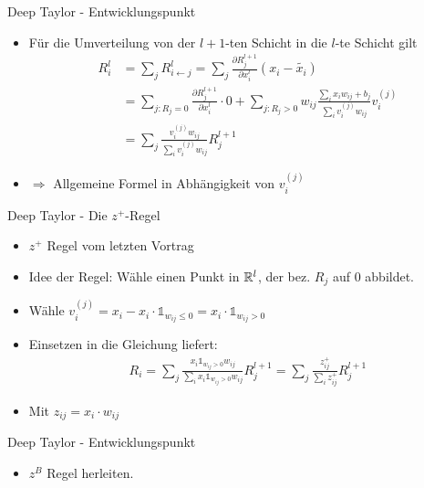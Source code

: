 \begin{frame}{Deep Taylor - Entwicklungspunkt}
\begin{itemize}
\item Für die Umverteilung von der $l+1$-ten Schicht in die $l$-te Schicht gilt
\begin{align*}
R_i^l &= \sum_{j} R_{i \leftarrow j}^l =  \sum_{j} \frac{\partial R_{j}^{l+1}}{\partial x_{i}^l}
(x_i - \tilde{x_i}) \\
&= \sum_{j : R_j = 0} \frac{\partial R_{j}^{l+1}}{\partial x_{i}^l} \cdot 0 + \sum_{j: R_j>0} w_{ij} \frac{\sum_{i} x_{i} w_{i j}+b_{j}}{\sum_{i} v_{i}^{(j)} w_{i j}} v_i^{(j)} \\
&= \sum_{j} \frac{v_i^{(j)}  w_{i j}}{\sum_{i} v_{i}^{(j)} w_{i j}} R_j^{l+1}
\end{align*}
\item $\Rightarrow$ Allgemeine Formel in Abhängigkeit von $v_i^{(j)}$
\end{itemize}
\end{frame}

\begin{frame}{Deep Taylor - Die $z^+$-Regel}
\begin{itemize}
\item $z^+$ Regel vom letzten Vortrag
\item Idee der Regel: Wähle einen Punkt in $\mathbb{R}^l$, der bez. $R_j$ auf $0$ abbildet.
\item Wähle $v_i^{(j)} = x_i - x_i \cdot \mathds{1}_{w_{ij} \leq 0} = x_i \cdot \mathds{1}_{w_{ij} > 0}$
\item Einsetzen in die Gleichung liefert:
\begin{align*}
R_i = \sum_{j} \frac{x_i \mathds{1}_{w_{ij} > 0} w_{i j}}{\sum_{i} x_i \mathds{1}_{w_{ij} > 0} w_{i j}} R_j^{l+1} = \sum_{j} \frac{z_{ij}^{+}}{\sum_{i} z_{ij}^{+}} R_j^{l+1}
\end{align*}
\item Mit $z_{ij} = x_i \cdot w_{ij}$
\end{itemize}
\end{frame}

\begin{frame}{Deep Taylor - Entwicklungspunkt}
\begin{itemize}
\item $z^B$ Regel herleiten.
\end{itemize}
\end{frame}